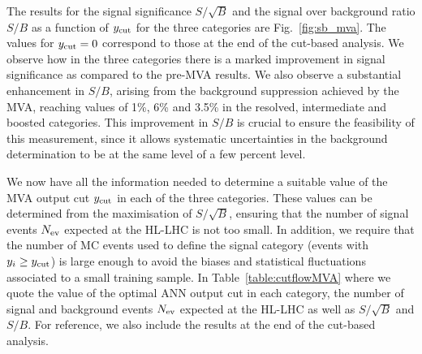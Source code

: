 The results for the signal significance $S/\sqrt{B}$ and
the signal over background ratio
$S/B$ as a function of $y_{\rm cut}$
for the three categories are
Fig.~\ref{fig:sb_mva}.
%
The values 
for $y_{\rm cut}=0$ correspond to those at
the end of the cut-based analysis.
%
We observe how in the three
 categories there is a marked  improvement in signal
significance as compared to the pre-MVA results.
%
We also observe a substantial enhancement in $S/B$, arising
from the background suppression achieved by the MVA, reaching
values of 1\%, 6\% and 3.5\% in the resolved,
intermediate and boosted categories.
%
This improvement in $S/B$ is crucial to ensure the feasibility
of this measurement, since it allows systematic
uncertainties in the background determination to
be at the same level of a few percent level.

We now have all the
information needed to determine a suitable
value of the MVA output cut $y_{\rm cut}$ in each
of the three categories.
%
These values can be determined from the maximisation of $S/\sqrt{B}$,
ensuring that the number of signal events $N_{\rm ev}$
expected at the HL-LHC is not too small.
%
In  addition, we require
that the number of MC events used to define the signal
category (events with $y_i \ge y_{\rm cut}$)
is large enough to avoid the biases and statistical
fluctuations associated to a small training sample.
%
In Table~\ref{table:cutflowMVA} where we quote
the value of the optimal ANN output
cut in each category,
the number of signal and background events $N_{\rm ev}$ expected
at the HL-LHC as well as $S/\sqrt{B}$ and $S/B$.
%
For reference, we also include the results at the end of
the cut-based
analysis.
%

